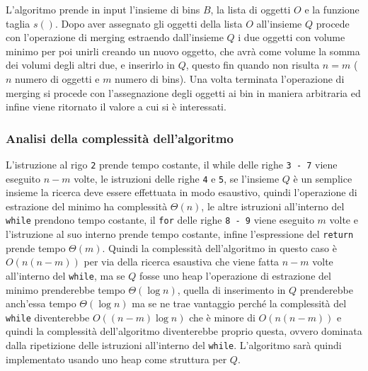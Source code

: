 \noindent
L'algoritmo prende in input l'insieme di bins $ B $, la lista di oggetti $ O $ e la funzione taglia $ s() $. Dopo aver assegnato gli oggetti della lista $ O $
all'insieme $ Q $ procede con l'operazione di merging estraendo dall'insieme $ Q $ i due oggetti con volume minimo per poi unirli creando un nuovo oggetto, che
avrà come volume la somma dei volumi degli altri due, e inserirlo in $ Q $, questo fin quando non risulta $ n = m $ ($ n $ numero di oggetti e $ m $ numero di bins). 
Una volta terminata l'operazione di merging si procede con l'assegnazione degli oggetti ai bin in maniera arbitraria ed infine viene ritornato il valore a cui si è interessati.

\subsubsection{Analisi della complessità dell'algoritmo}
L'istruzione al rigo \texttt{2} prende tempo costante, il while delle righe \texttt{3 - 7} viene eseguito 
$ n - m $ volte, le istruzioni delle righe \texttt{4} e \texttt{5}, se l'insieme $ Q $ è un semplice insieme la ricerca deve essere effettuata in modo esaustivo, quindi l'operazione di 
estrazione del minimo ha complessità $ \Theta(n) $, le altre istruzioni all'interno del \texttt{while} prendono tempo costante, il \texttt{for} delle righe \texttt{8 - 9} viene eseguito 
$ m $ volte e l'istruzione al suo interno prende tempo costante, infine l'espressione del \texttt{return} prende tempo $ \Theta(m) $. Quindi la complessità dell'algoritmo
in questo caso è $ O(n(n - m)) $ per via della ricerca esaustiva che viene fatta $ n - m $ volte all'interno del \texttt{while}, ma se $ Q $ fosse uno heap l'operazione di 
estrazione del minimo prenderebbe tempo $ \Theta(\log{}n) $, quella di inserimento in $ Q $ prenderebbe anch'essa tempo $ \Theta(\log{}n) $ ma se ne trae vantaggio
perché la complessità del \texttt{while} diventerebbe $ O((n - m) \log{}n) $ che è minore di $ O(n(n - m)) $ e quindi la complessità dell'algoritmo diventerebbe proprio questa,
ovvero dominata dalla ripetizione delle istruzioni all'interno del \texttt{while}. L'algoritmo sarà quindi implementato usando uno heap come struttura per $ Q $.

